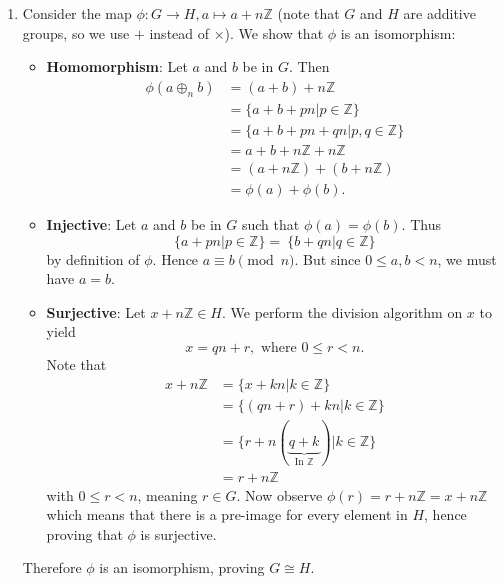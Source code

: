 \begin{enumerate}
    \item Consider the map $\phi: G \to H, a \mapsto a + n\mathbb{Z}$ (note that $G$ and $H$ are additive groups, so we use $+$ instead of $\times$). We show that $\phi$ is an isomorphism:
    \begin{itemize}
        \item \textbf{Homomorphism}: Let $a$ and $b$ be in $G$. Then
        \begin{align*}
            \phi(a\oplus_n b) &= (a+b) + n\mathbb{Z}\\
            &= \{a+b + pn \vert p \in \mathbb{Z}\}\\
            &= \{a+b + pn + qn\vert p, q \in \mathbb{Z}\}\\
            &= a+b+n\mathbb{Z} + n\mathbb{Z}\\
            &= (a+n\mathbb{Z}) + (b + n\mathbb{Z})\\
            &= \phi(a) + \phi(b).
        \end{align*}
        \item \textbf{Injective}: Let $a$ and $b$ be in $G$ such that $\phi(a) = \phi(b)$. Thus
        \[
            \{a + pn \vert p \in \mathbb{Z} \} = \ \{b + qn \vert q \in \mathbb{Z} \}
        \]
        by definition of $\phi$. Hence $a \equiv b \pmod n$. But since $0 \leq a, b < n$, we must have $a = b$.
        \item \textbf{Surjective}: Let $x + n\mathbb{Z} \in H$. We perform the division algorithm on $x$ to yield
        \[
            x = qn + r, \text{ where } 0 \leq r < n.
        \]
        Note that
        \begin{align*}
            x + n\mathbb{Z} &= \{x + kn \vert k \in \mathbb{Z}\}\\
            &= \{(qn + r) + kn \vert k \in \mathbb{Z}\}\\
            &= \{r + n(\underbrace{q + k}_{\text{In }\mathbb{Z}}) \vert k \in \mathbb{Z} \}\\
            &= r + n\mathbb{Z}
        \end{align*}
        with $0 \leq r < n$, meaning $r \in G$. Now observe $\phi(r) = r+n\mathbb{Z} = x+n\mathbb{Z}$ which means that there is a pre-image for every element in $H$, hence proving that $\phi$ is surjective.
    \end{itemize}
    Therefore $\phi$ is an isomorphism, proving $G \cong H$.
    

\end{enumerate}
